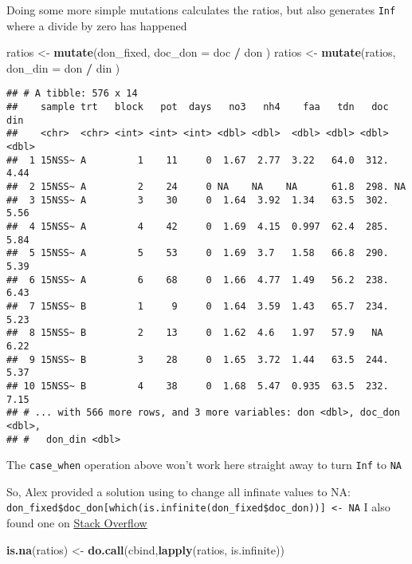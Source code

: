 \documentclass[]{article}
\newenvironment{Shaded}{\begin{snugshade}}{\end{snugshade}}
\newcommand{\KeywordTok}[1]{\textcolor[rgb]{0.13,0.29,0.53}{\textbf{#1}}}
\newcommand{\DataTypeTok}[1]{\textcolor[rgb]{0.13,0.29,0.53}{#1}}
\newcommand{\StringTok}[1]{\textcolor[rgb]{0.31,0.60,0.02}{#1}}
\newcommand{\OperatorTok}[1]{\textcolor[rgb]{0.81,0.36,0.00}{\textbf{#1}}}
\newcommand{\NormalTok}[1]{#1}
\begin{document}
Doing some more simple mutations calculates the ratios, but also
generates \texttt{Inf} where a divide by zero has happened

\begin{Shaded}
\begin{Highlighting}[]
\NormalTok{ratios <-}\StringTok{ }\KeywordTok{mutate}\NormalTok{(don_fixed, }\DataTypeTok{doc_don =}\NormalTok{ doc }\OperatorTok{/}\StringTok{ }\NormalTok{don )}
\NormalTok{ratios <-}\StringTok{ }\KeywordTok{mutate}\NormalTok{(ratios, }\DataTypeTok{don_din =}\NormalTok{ don }\OperatorTok{/}\StringTok{ }\NormalTok{din )}
\end{Highlighting}
\end{Shaded}

\begin{verbatim}
## # A tibble: 576 x 14
##    sample trt   block   pot  days   no3   nh4    faa   tdn   doc   din
##    <chr>  <chr> <int> <int> <int> <dbl> <dbl>  <dbl> <dbl> <dbl> <dbl>
##  1 15NSS~ A         1    11     0  1.67  2.77  3.22   64.0  312.  4.44
##  2 15NSS~ A         2    24     0 NA    NA    NA      61.8  298. NA   
##  3 15NSS~ A         3    30     0  1.64  3.92  1.34   63.5  302.  5.56
##  4 15NSS~ A         4    42     0  1.69  4.15  0.997  62.4  285.  5.84
##  5 15NSS~ A         5    53     0  1.69  3.7   1.58   66.8  290.  5.39
##  6 15NSS~ A         6    68     0  1.66  4.77  1.49   56.2  238.  6.43
##  7 15NSS~ B         1     9     0  1.64  3.59  1.43   65.7  234.  5.23
##  8 15NSS~ B         2    13     0  1.62  4.6   1.97   57.9   NA   6.22
##  9 15NSS~ B         3    28     0  1.65  3.72  1.44   63.5  244.  5.37
## 10 15NSS~ B         4    38     0  1.68  5.47  0.935  63.5  232.  7.15
## # ... with 566 more rows, and 3 more variables: don <dbl>, doc_don <dbl>,
## #   don_din <dbl>
\end{verbatim}

The \texttt{case\_when} operation above won't work here straight away to
turn \texttt{Inf} to \texttt{\textquotesingle{}NA\textquotesingle{}}

So, Alex provided a solution using to change all infinate values to NA:
\texttt{don\_fixed\$doc\_don{[}which(is.infinite(don\_fixed\$doc\_don)){]}\ \textless{}-\ NA}
I also found one on
\href{https://stackoverflow.com/questions/12188509/cleaning-inf-values-from-an-r-dataframe}{Stack
Overflow}

\begin{Shaded}
\begin{Highlighting}[]
\KeywordTok{is.na}\NormalTok{(ratios) <-}\StringTok{ }\KeywordTok{do.call}\NormalTok{(cbind,}\KeywordTok{lapply}\NormalTok{(ratios, is.infinite))}
\end{Highlighting}
\end{Shaded}
\end{document}
